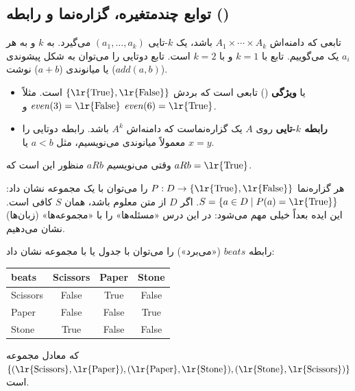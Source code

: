 \subsection{توابع چندمتغیره، گزاره‌نما و رابطه ()}
تابعی که دامنه‌اش $A_1\times\cdots\times A_k$ باشد، یک $k$-تایی $(a_1,\dots,a_k)$ می‌گیرد. به $k$  و به هر $a_i$ یک  می‌گوییم. تابع با $k=1$  و با $k=2$  است. تابع دوتایی را می‌توان به شکل پیشوندی ($\mathit{add}(a,b)$) یا میانوندی ($a+b$) نوشت.

\begin{definition}
\begin{itemize}
\item {} یا \textbf{ویژگی} () تابعی است که بردش $\{\text{\lr{True}},\text{\lr{False}}\}$ است. مثلاً $\mathit{even}(3)=\text{\lr{False}}$ و $\mathit{even}(6)=\text{\lr{True}}$.
\item \textbf{رابطه $k$-تایی} روی $A$ یک گزاره‌نماست که دامنه‌اش $A^k$ باشد. رابطه دوتایی را معمولاً میانوندی می‌نویسیم، مثل $a<b$ یا $x=y$.
\end{itemize}
وقتی می‌نویسیم $aRb$ منظور این است که $aRb=\text{\lr{True}}$.
\end{definition}

هر گزاره‌نما $P:D\to\{\text{\lr{True}},\text{\lr{False}}\}$ را می‌توان با یک مجموعه نشان داد: $S=\{a\in D\st P(a)=\text{\lr{True}}\}$. اگر $D$ از متن معلوم باشد، همان $S$ کافی است. این ایده بعداً خیلی مهم می‌شود: در این درس «مسئله‌ها» را با «مجموعه‌ها» (زبان‌ها) نشان می‌دهیم.

\begin{example}
رابطه $\mathit{beats}$ («می‌برد») را می‌توان با جدول یا با مجموعه نشان داد:
\begin{ltrfig}
\begin{tabular}{l|ccc}
beats & Scissors & Paper & Stone\\ \hline
Scissors & False & True & False\\
Paper & False & False & True\\
Stone & True & False & False
\end{tabular}
\end{ltrfig}
که معادل مجموعه $\{(\text{\lr{Scissors}},\text{\lr{Paper}}),(\text{\lr{Paper}},\text{\lr{Stone}}),(\text{\lr{Stone}},\text{\lr{Scissors}})\}$ است.
\end{example}

